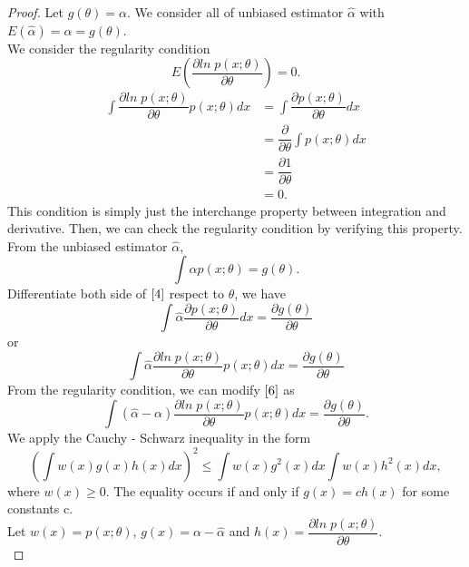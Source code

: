 \documentclass{article}
\begin{document}
\begin{proof}
Let $g(\theta) = \alpha$. We consider all of unbiased estimator $\widehat{\alpha}$ with $E(\widehat{\alpha}) = \alpha = g(\theta).$ \\
We consider the regularity condition 
$$E\left(\dfrac{\partial ln \;p(x;\theta)}{\partial \theta}\right) = 0.$$
\begin{align*}
    \int \dfrac{\partial ln\; p(x;\theta)}{\partial \theta}p(x;\theta) dx &= \int \dfrac{\partial p(x;\theta)}{\partial \theta}dx \\
    &= \dfrac{\partial}{\partial \theta}\int p(x;\theta)dx \\
    &= \dfrac{\partial 1}{\partial \theta} \\
    &= 0.
\end{align*}
This condition is simply just the interchange property between integration and derivative. Then, we can check the regularity condition by verifying this property. \\
From the unbiased estimator $\widehat{\alpha}$, 
\begin{equation}\label{4}
    \int \widehat{\alpha}p(x;\theta) = g(\theta).
\end{equation}
Differentiate both side of $\eqref{4}$ respect to $\theta$, we have 
\begin{equation}\label{5}
    \int\widehat{\alpha}\dfrac{\partial p(x;\theta)}{\partial \theta}dx = \dfrac{\partial g(\theta)}{\partial \theta}
\end{equation}
or 
\begin{equation}\label{6}
    \int\widehat{\alpha}\dfrac{\partial ln\; p(x;\theta)}{\partial \theta} p(x;\theta) dx = \dfrac{\partial g(\theta)}{\partial \theta}
\end{equation}
From the regularity condition, we can modify $\eqref{6}$ as 
\begin{equation}
\int(\widehat{\alpha} - \alpha)\dfrac{\partial ln\; p(x;\theta)}{\partial \theta}p(x;\theta)dx = \dfrac{\partial g(\theta)}{\partial \theta}.
\end{equation}
We apply the Cauchy - Schwarz inequality in the form 
\begin{equation}\label{8}
\left(\int w(x)g(x)h(x)dx\right)^{2} \leq \int w(x)g^{2}(x)dx \int w(x)h^{2}(x)dx,
\end{equation}
where $w(x) \geq 0$. The equality occurs if and only if $g(x) =  c h(x)$ for some constants c. \\
Let $w(x) = p(x;\theta)$, $g(x) = \alpha - \widehat{\alpha}$ and $h(x) = \dfrac{\partial ln \; p(x;\theta)}{\partial \theta}.$ \\

\end{proof}
\end{document}
